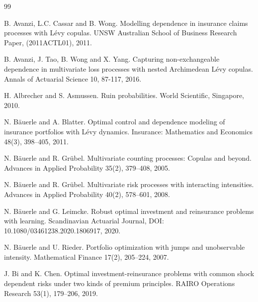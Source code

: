 \documentclass[reqno, 11pt]{amsart}%
\theoremstyle{definition}
\numberwithin{equation}{section} \numberwithin{theorem}{section}
\begin{document}
\begin{thebibliography}{99}

 B. Avanzi, L.C. Cassar and B. Wong. Modelling dependence in insurance claims processes with L\'evy copulas. UNSW Australian School of Business Research Paper, (2011ACTL01), 2011.

 B. Avanzi, J. Tao, B. Wong and X. Yang. Capturing non-exchangeable dependence in multivariate loss processes with nested Archimedean L\'evy copulas. Annals of Actuarial Science 10, 87-117, 2016.

 H. Albrecher and S. Asmussen. Ruin probabilities. World Scientific, Singapore, 2010.


 N. B\"auerle and A. Blatter. Optimal control and dependence modeling of insurance portfolios with L\'{e}vy dynamics. Insurance: Mathematics and Economics 48(3), 398--405, 2011.

 N. B\"auerle and R. Gr\"ubel. Multivariate counting processes: Copulas and beyond. Advances in Applied Probability 35(2), 379--408, 2005.

 N. B\"auerle and R. Gr\"ubel. Multivariate  risk  processes  with  interacting  intensities. Advances in Applied Probability 40(2), 578--601, 2008.

 N. B\"auerle and G. Leimcke. Robust optimal investment and reinsurance problems with learning. Scandinavian Actuarial Journal, DOI: 10.1080/03461238.2020.1806917, 2020.


 N. B\"auerle and U. Rieder. Portfolio optimization with jumps and unobservable intensity. Mathematical Finance 17(2), 205--224, 2007.



 J. Bi and K. Chen. Optimal investment-reinsurance problems with common shock dependent risks under two kinds of premium principles. RAIRO Operations Research 53(1), 179--206, 2019.


\end{thebibliography}
\end{document}
